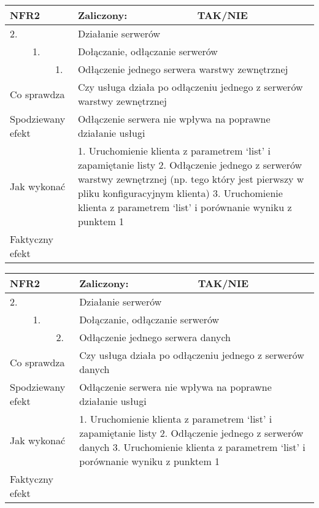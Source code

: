 \begin{tabular}{|p{20pt}|p{20pt}|p{20pt}|p{250pt}|p{60pt}|}
	\hline
	\multicolumn{3}{|p{70pt}|}{NFR2} & Zaliczony: & TAK/NIE \\ \hline
	2. & & & \multicolumn{2}{|p{310pt}|}{Działanie serwerów } \\ \hline
	& 1. & & \multicolumn{2}{|p{310pt}|}{Dołączanie, odłączanie serwerów } \\ \hline
	& & 1. & \multicolumn{2}{|p{310pt}|}{Odłączenie jednego serwera warstwy zewnętrznej } \\ \hline
	\multicolumn{3}{|p{70pt}|}{Co sprawdza} & \multicolumn{2}{|p{310pt}|}{Czy usługa działa po odłączeniu jednego z serwerów warstwy zewnętrznej} \\ \hline
	\multicolumn{3}{|p{70pt}|}{Spodziewany efekt} & \multicolumn{2}{|p{310pt}|}{Odłączenie serwera nie wpływa na poprawne działanie usługi} \\ \hline
	\multicolumn{3}{|p{70pt}|}{Jak wykonać} & \multicolumn{2}{|p{310pt}|}{1. Uruchomienie klienta z parametrem ‘list’ i zapamiętanie listy
2. Odłączenie jednego z serwerów warstwy zewnętrznej (np. tego który jest pierwszy w pliku konfiguracyjnym klienta)
3. Uruchomienie klienta z parametrem ‘list’ i porównanie wyniku z punktem 1} \\ \hline
	\multicolumn{3}{|p{70pt}|}{Faktyczny efekt} & \multicolumn{2}{|p{310pt}|}{} \\ \hline
\end{tabular}

\begin{tabular}{|p{20pt}|p{20pt}|p{20pt}|p{250pt}|p{60pt}|}
	\hline
	\multicolumn{3}{|p{70pt}|}{NFR2} & Zaliczony: & TAK/NIE \\ \hline
	2. & & & \multicolumn{2}{|p{310pt}|}{Działanie serwerów } \\ \hline
	& 1. & & \multicolumn{2}{|p{310pt}|}{Dołączanie, odłączanie serwerów } \\ \hline
	& & 2. & \multicolumn{2}{|p{310pt}|}{Odłączenie jednego serwera danych } \\ \hline
	\multicolumn{3}{|p{70pt}|}{Co sprawdza} & \multicolumn{2}{|p{310pt}|}{Czy usługa działa po odłączeniu jednego z serwerów danych} \\ \hline
	\multicolumn{3}{|p{70pt}|}{Spodziewany efekt} & \multicolumn{2}{|p{310pt}|}{Odłączenie serwera nie wpływa na poprawne działanie usługi} \\ \hline
	\multicolumn{3}{|p{70pt}|}{Jak wykonać} & \multicolumn{2}{|p{310pt}|}{1. Uruchomienie klienta z parametrem ‘list’ i zapamiętanie listy
2. Odłączenie jednego z serwerów danych
3. Uruchomienie klienta z parametrem ‘list’ i porównanie wyniku z punktem 1} \\ \hline
	\multicolumn{3}{|p{70pt}|}{Faktyczny efekt} & \multicolumn{2}{|p{310pt}|}{} \\ \hline
\end{tabular}

